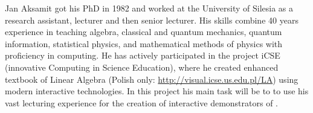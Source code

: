 
\begin{participant}[type=PI,PM=12,salary=1400,gender=male]{Jan Aksamit}
got his PhD in 1982 and worked at the University of Silesia as a research
assistant, lecturer and then senior lecturer. His skills combine 40 years 
experience in teaching algebra, classical and quantum
mechanics, quantum information, statistical physics, and mathematical
methods of physics with proficiency in computing. He has actively
participated in the project iCSE (innovative Computing in Science
Education), where he created \Sage enhanced textbook of Linear Algebra
(Polish only: \url{http://visual.icse.us.edu.pl/LA}) using modern
interactive technologies. In this project his main task will be to
to use his vast lecturing experience for the creation of
interactive demonstrators of \TheProject.
\end{participant}

